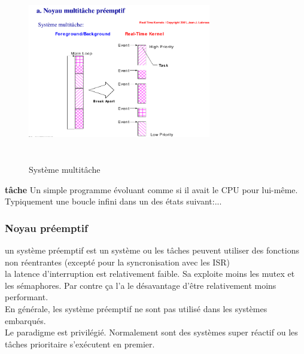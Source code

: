 \documentclass[oneside]{book}
\begin{document}
    \begin{figure}[!ht]
  	\centering
  	\includegraphics[width=8cm, height = 8cm, keepaspectratio]{Images/multitache.png}
  	\caption{Système multitâche}
  	\label{fig:Multitache}
	\end{figure}  
 
    \textbf{tâche} Un simple programme évoluant comme si il avait le CPU pour lui-même. Typiquement une boucle infini dans un des états suivant:...\\
    \subsubsection{Noyau préemptif}
    un système préemptif est un système ou les tâches peuvent utiliser des fonctions non réentrantes (excepté pour la syncronisation avec les ISR)\\
    
    la latence d'interruption est relativement faible. Sa exploite moins les mutex et les sémaphores. Par contre ça l'a le désavantage d'être relativement moins performant.\\
    
    En générale, les système préemptif ne sont pas utilisé dans les systèmes embarqués.\\
    
    Le paradigme est privilégié. Normalement sont des systèmes super réactif ou les tâches prioritaire s'exécutent en premier.\\
    
\end{document}
